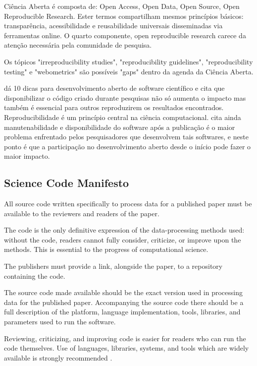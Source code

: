 \documentclass[12pt]{article}
\begin{document}
Ciência Aberta é composta de: Open Access, Open Data, Open Source, Open
Reproducible Research. Ester termos compartilham mesmos princípios básicos:
transparência, acessibilidade e reusabilidade universais disseminadas via
ferramentas online. O quarto componente, open reproducible research carece da
atenção necessária pela comunidade de pesquisa\cite{Nancy2015}.

Os tópicos "irreproducibility studies", "reproducibility guidelines",
"reproducibility testing" e "webometrics" são possíveis "gaps" dentro da
agenda da Ciência Aberta\cite{Nancy2015}.

\cite{Prlic2012} dá 10 dicas para desenvolvimento aberto de software
científico e cita que disponibilizar o código criado durante pesquisas não só
aumenta o impacto mas também é essencial para outros reproduzirem os
resultados encontrados. Reproducibilidade é um princípio central na ciência
computacional. \cite{Prlic2012} cita ainda manutenabilidade e disponibilidade
do software após a publicação é o maior problema enfrentado pelos
pesquisadores que desenvolvem tais softwares, e neste ponto é que a
participação no desenvolvimento aberto desde o início pode fazer o maior
impacto.

\subsection{Science Code Manifesto}

All source code written specifically to process data for a published paper must be available to the reviewers and readers of the paper.

The code is the only definitive expression of the data-processing methods used: without the code, readers cannot fully consider, criticize, or improve upon the methods. This is essential to the progress of computational science.

The publishers must provide a link, alongside the paper, to a repository containing the code.

The source code made available should be the exact version used in processing data for the published paper. Accompanying the source code there should be a full description of the platform, language implementation, tools, libraries, and parameters used to run the software.

Reviewing, criticizing, and improving code is easier for readers who can run
the code themselves. Use of languages, libraries, systems, and tools which are
widely available is strongly recommended \cite{McCormick2014}
\cite{Barnes2013}.
\end{document}
